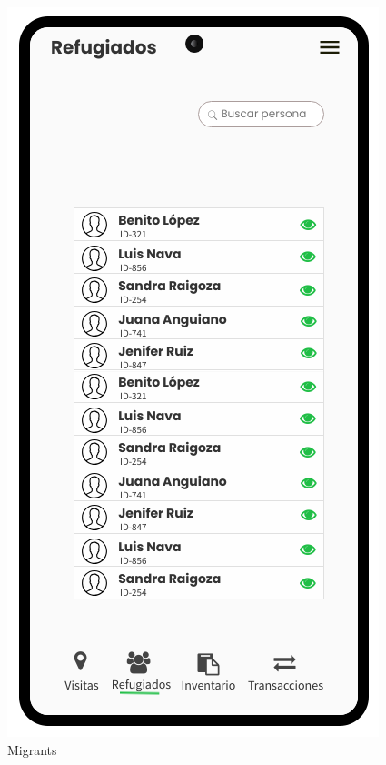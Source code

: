 \documentclass{scrreprt}
\begin{document}
\begin{figure}[H]
   \begin{minipage}{0.4\textwidth}
     \centering
     \includegraphics[width=.7\linewidth]{Refugiados}
     \caption{Migrants}\label{Fig:Data1}
   \end{minipage}\hfill
   \begin{minipage}{0.4\textwidth}
     \centering

\end{minipage}
\end{figure}
\end{document}
